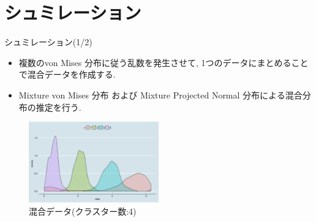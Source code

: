 \documentclass[dvipdfmx]{beamer}
\begin{document}
\section{シュミレーション}
\begin{frame}{シュミレーション(1/2)}

\begin{itemize}
\item
複数のvon Mises 分布に従う乱数を発生させて, 1つのデータにまとめることで混合データを作成する.

\item
Mixture von Mises 分布 および Mixture Projected Normal 分布による混合分布の推定を行う.
\end{itemize}

\vspace{-0.3cm}
\begin{figure}[H]
\begin{center}
\includegraphics[clip,height= 35mm]{data/mix_test_data.png}
\end{center}
\caption{混合データ(クラスター数:4)}
\label{mixdata}
\end{figure}

\end{frame}
\end{document}
